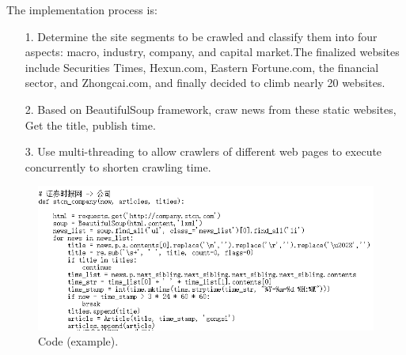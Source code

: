 \documentclass{article}
\begin{document}
The implementation process is:
\begin{itemize}
	\item[1.] Determine the site segments to be crawled and classify them into four aspects: macro, industry, company, and capital market.The finalized websites include Securities Times, Hexun.com, Eastern Fortune.com, the financial sector, and Zhongcai.com, and finally decided to climb nearly 20 websites.
	\item[2.] Based on BeautifulSoup framework, craw news from these static websites, Get the title, publish time.
	\item[3.] Use multi-threading to allow crawlers of different web pages to execute concurrently to shorten crawling time.
\end{itemize}
\begin{figure}[htb]
	\centering
	\includegraphics[width=5in]{code_example.png}
	\caption{Code (example).}
\end{figure}
\end{document}
